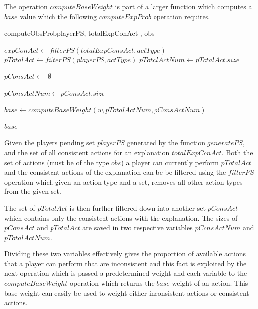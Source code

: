 \documentclass[parskip]{cs4rep}
\begin{document}
The operation $computeBaseWeight$ is part of a larger function which computes a $base$ value which the following $computeExpProb$ operation requires.

\begin{pseudocode}[ruled]{computeObsProb}{playerPS, totalExpConAct , obs}
\begin{algorithm}[H]
$expConAct \gets filterPS(totalExpConsAct, actType)$ \newline
$pTotalAct \gets filterPS(playerPS, actType)$\newline
$pTotalActNum \gets pTotalAct.size$ \newline

$pConsAct \gets $ $\emptyset$ \newline


$pConsActNum \gets pConsAct.size$\newline

$base \gets computeBaseWeight(w, pTotalActNum, pConsActNum)$\newline 

\Return $base$

\end{algorithm}
\end{pseudocode}

Given the players pending set $playerPS$ generated by the function $generatePS$, and the set of all consistent actions for an explanation $totalExpConAct$. Both the set of actions (must be of the type $obs$) a player can currently perform $pTotalAct$ and the consistent actions of the explanation can be be filtered using the $filterPS$ operation which given an action type and a set, removes all other action types from the given set. 

The set of $pTotalAct$ is then further filtered down into another set $pConsAct$ which contains only the consistent actions with the explanation. The sizes of $pConsAct$ and $pTotalAct$ are saved in two respective variables $pConsActNum$ and $pTotalActNum$.

Dividing these two variables effectively gives the proportion of available actions that a player can perform that are inconsistent and this fact is exploited by the next operation which is passed a predetermined weight and each variable to the $computeBaseWeight$ operation which returns the $base$ weight of an action. This base weight can easily be used to weight either inconsistent actions or consistent actions.
\end{document}
